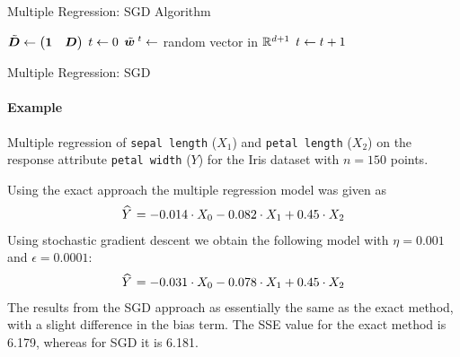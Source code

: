 \begin{frame}{Multiple Regression: SGD Algorithm}
\begin{tightalgo}[H]{\textwidth-18pt}
\Algorithm{} 
$\tilde{{\boldsymbol D}} \leftarrow \bigl(\mathbf{1} \quad {\boldsymbol D}\bigr)$ \;
$t \leftarrow 0$ \; 
$\tilde{{\boldsymbol w}}^{\;t} \leftarrow $ random vector in ${\mathord{\mathbb R}}^{d+1}$ \;
{%
    $t \leftarrow t+1$\;
}%
\end{tightalgo}
\end{frame}
%
%
%
%
%
%
\begin{frame}{Multiple Regression: SGD}
\framesubtitle{Example}
    Multiple regression of 
{\tt sepal length} ($X_1$) and {\tt petal
    length} ($X_2$) on the response attribute {\tt petal width} ($Y$)
for the Iris dataset with $n=150$ points. 
    
    Using
    the exact approach the multiple regression model was given as
    \begin{align*}
        \mkern 1.5mu\widehat{\mkern-1.5muY}\mkern 1.5mu = -0.014 \cdot X_0 -0.082 \cdot X_1 + 0.45 \cdot X_2 \end{align*}
    Using stochastic gradient descent we obtain the following model with
    $\eta=0.001$ and $\epsilon=0.0001$:
    \begin{align*}
        \mkern 1.5mu\widehat{\mkern-1.5muY}\mkern 1.5mu = -0.031 \cdot X_0 -0.078 \cdot X_1 + 0.45 \cdot X_2
    \end{align*}
    The results from the SGD approach as essentially the same as the
    exact method, with a slight difference in the bias term.
    The SSE value for the exact
    method is 6.179, whereas for SGD it is 6.181.
\end{frame}
